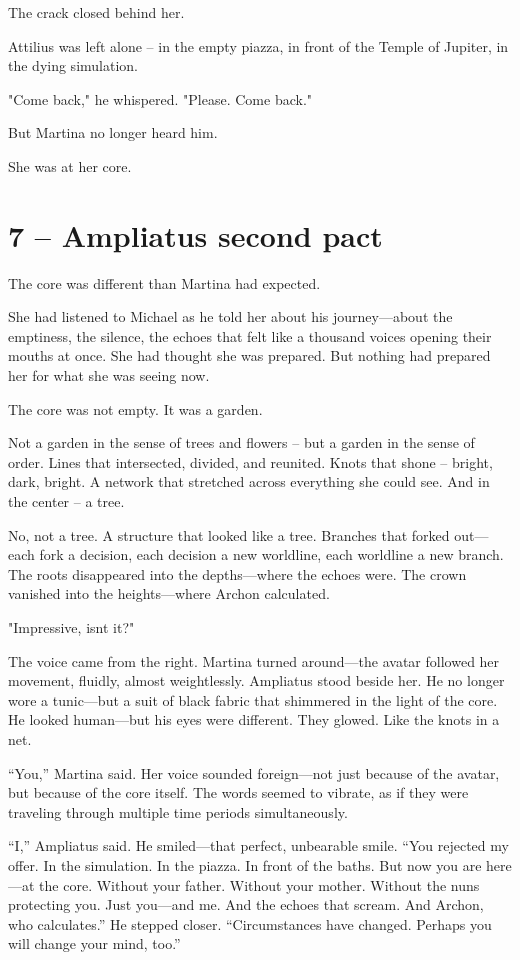 \documentclass[
]{article}
\begin{document}
The crack closed behind her.

Attilius was left alone -- in the empty piazza, in front of the Temple of Jupiter, in the dying simulation.

"Come back," he whispered. "Please. Come back."

But Martina no longer heard him.

She was at her core.

\section{7 -- Ampliatus\textquotesingle{} second pact}\label{ampliatus-second-pact}

The core was different than Martina had expected.

She had listened to Michael as he told her about his journey---about the emptiness, the silence, the echoes that felt like a thousand voices opening their mouths at once. She had thought she was prepared. But nothing had prepared her for what she was seeing now.

The core was not empty. It was a garden.

Not a garden in the sense of trees and flowers -- but a garden in the sense of order. Lines that intersected, divided, and reunited. Knots that shone -- bright, dark, bright. A network that stretched across everything she could see. And in the center -- a tree.

No, not a tree. A structure that looked like a tree. Branches that forked out---each fork a decision, each decision a new worldline, each worldline a new branch. The roots disappeared into the depths---where the echoes were. The crown vanished into the heights---where Archon calculated.

"Impressive, isn\textquotesingle t it?"

The voice came from the right. Martina turned around---the avatar followed her movement, fluidly, almost weightlessly. Ampliatus stood beside her. He no longer wore a tunic---but a suit of black fabric that shimmered in the light of the core. He looked human---but his eyes were different. They glowed. Like the knots in a net.

``You,'' Martina said. Her voice sounded foreign---not just because of the avatar, but because of the core itself. The words seemed to vibrate, as if they were traveling through multiple time periods simultaneously.

``I,'' Ampliatus said. He smiled---that perfect, unbearable smile. ``You rejected my offer. In the simulation. In the piazza. In front of the baths. But now you are here---at the core. Without your father. Without your mother. Without the nuns protecting you. Just you---and me. And the echoes that scream. And Archon, who calculates.'' He stepped closer. ``Circumstances have changed. Perhaps you will change your mind, too.''
\end{document}
